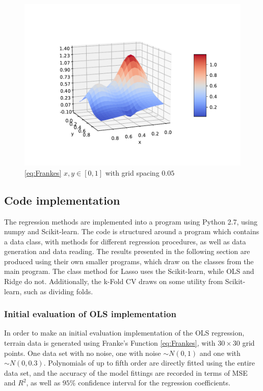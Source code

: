 \documentclass[%
oneside,                 %
final,                   %
10pt]{article}
\begin{document}
\begin{figure}[!h]
        \centering 
         \includegraphics[scale=0.7]{../Results/Part_a/frankeplot.pdf} 
        \caption{\eqref{eq:Frankes} $x,y\in [0,1]$ with grid spacing $0.05$}
        \label{fig:franke}   
\end{figure}  
\subsection{Code implementation}
The regression methods are implemented into a program using Python 2.7, using numpy and Scikit-learn. The code is structured around a program which contains a data class, with methods for different regression procedures, as well as data generation and data reading. The results presented in the following section are produced using their own smaller programs, which draw on the classes from the main program. The class method for Lasso uses the Scikit-learn, while OLS and Ridge do not. Additionally, the k-Fold CV draws on some utility from Scikit-learn, such as dividing folds.

\subsubsection{Initial evaluation of OLS implementation}\label{S:Code_impl_init_ols}
In order to make an initial evaluation implementation of the OLS regression, terrain data is generated using Franke's Function \eqref{eq:Frankes}, with $30 \times 30$ grid points. One data set with no noise, one with noise $\sim N(0,1)$ and one with $\sim N(0,0.3)$. Polynomials of up to fifth order are directly fitted using the entire data set, and the accuracy of the model fittings are recorded in terms of MSE and $R^2$, as well as $95\%$ confidence interval for the regression coefficients. 
\end{document}

